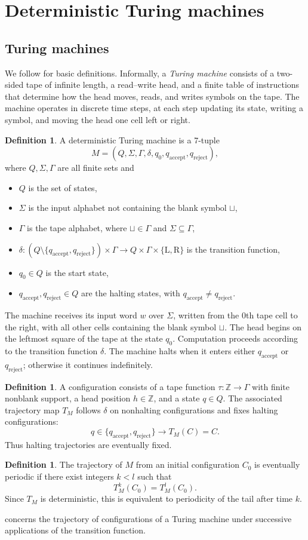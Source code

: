 \documentclass{amsart}
\theoremstyle{definition}
\newtheorem{definition}[theorem]{Definition}
\theoremstyle{remark}
\numberwithin{equation}{section}
\newcommand{\Z}{\mathbb{Z}}
\newcommand{\qa}{q_{\mathrm{accept}}}
\newcommand{\qr}{q_{\mathrm{reject}}}
\begin{document}
\section{Deterministic Turing machines}

\subsection{Turing machines}\label{sec:tm}
We follow \cite{Sipser2012} for basic definitions.
Informally, a \emph{Turing machine} consists of a two-sided tape of infinite length, a read--write head, and a finite table of instructions that determine how the head moves, reads, and writes symbols on the tape.
The machine operates in discrete time steps, at each step updating its state, writing a symbol, and moving the head one cell left or right.

\begin{definition}
	A deterministic Turing machine is a 7-tuple
	\[M=(Q, \Sigma, \Gamma, \delta, q_0, \qa, \qr),\]
	where $Q, \Sigma, \Gamma$ are all finite sets and
	\begin{itemize}
		\item $Q$ is the set of states,
		\item $\Sigma$ is the input alphabet not containing the blank symbol $\sqcup$,
		\item $\Gamma$ is the tape alphabet, where $\sqcup \in \Gamma$ and $\Sigma\subseteq\Gamma$,
		\item $\delta: (Q\setminus\{\qa,\qr\})\times\Gamma \to Q \times \Gamma \times \{\mathrm{L},\mathrm{R}\}$ is the transition function,
		\item $q_0 \in Q$ is the start state,
		\item $\qa, \qr \in Q$ are the halting states, with $\qa \neq \qr$.
	\end{itemize}
\end{definition}
The machine receives its input word $w$ over $\Sigma$, written from the \(0\)th tape cell to the right, with all other cells containing the blank symbol $\sqcup$.
The head begins on the leftmost square of the tape at the state $q_0$.
Computation proceeds according to the transition function $\delta$.
The machine halts when it enters either $\qa$ or $\qr$; otherwise it continues indefinitely.

\begin{definition}\label{def_ct}
A configuration consists of a tape function $\tau:\Z\to\Gamma$ with finite nonblank support, a head position $h\in\Z$, and a state $q\in Q$.
The associated trajectory map $T_M$ follows $\delta$ on nonhalting configurations and fixes halting configurations:
\[q\in\{\qa,\qr\}\to T_M(C)=C.\]
Thus halting trajectories are eventually fixed.
\end{definition}
\begin{definition}
The trajectory of $M$ from an initial configuration $C_0$ is eventually periodic if there exist integers $k<l$ such that
\[T^k_M(C_0)=T^l_M(C_0).\]
Since $T_M$ is deterministic, this is equivalent to periodicity of the tail after time $k$.
\end{definition}
 concerns the trajectory of configurations of a Turing machine under successive applications of the transition function.
\end{document}
